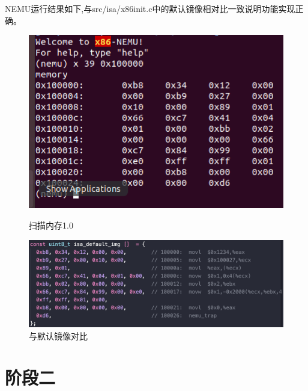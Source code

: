 \documentclass[UTF8,a4paper,10pt]{ctexart}
\begin{document}
{    NEMU运行结果如下,与src/isa/x86init.c中的默认镜像相对比一致说明功能实现正确。
    \begin{figure}[!h]
        \begin{minipage}[h]{0.5\linewidth}
        \centering
        \includegraphics[scale=0.35]{fig/4.png}
        \caption{扫描内存1.0}
        \end{minipage}%
        \hfill
        \begin{minipage}[h]{0.5\linewidth}
        \centering
        \includegraphics[scale=0.33]{fig/5.png}
        \caption{与默认镜像对比}
        \end{minipage}
    \end{figure}
}
\section{阶段二}
\end{document}
